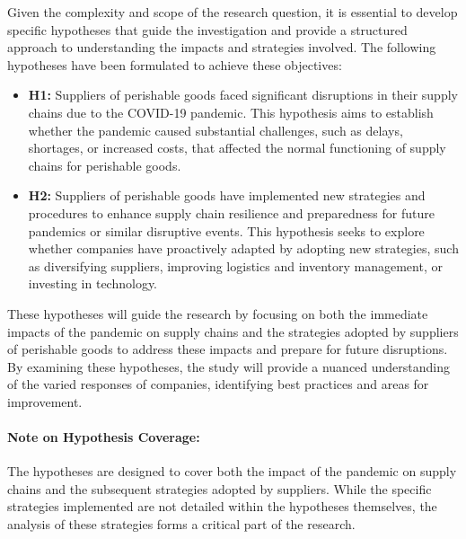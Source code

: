 Given the complexity and scope of the research question, it is essential to develop specific hypotheses that guide the investigation and provide a structured approach to understanding the impacts and strategies involved. The following hypotheses have been formulated to achieve these objectives:

\begin{itemize}
    \item \textbf{H1:} Suppliers of perishable goods faced significant disruptions in their supply chains due to the COVID-19 pandemic. This hypothesis aims to establish whether the pandemic caused substantial challenges, such as delays, shortages, or increased costs, that affected the normal functioning of supply chains for perishable goods.

    \item \textbf{H2:} Suppliers of perishable goods have implemented new strategies and procedures to enhance supply chain resilience and preparedness for future pandemics or similar disruptive events. This hypothesis seeks to explore whether companies have proactively adapted by adopting new strategies, such as diversifying suppliers, improving logistics and inventory management, or investing in technology.

\end{itemize}

These hypotheses will guide the research by focusing on both the immediate impacts of the pandemic on supply chains and the strategies adopted by suppliers of perishable goods to address these impacts and prepare for future disruptions. By examining these hypotheses, the study will provide a nuanced understanding of the varied responses of companies, identifying best practices and areas for improvement.

\paragraph*{\textbf{Note on Hypothesis Coverage:}} The hypotheses are designed to cover both the impact of the pandemic on supply chains and the subsequent strategies adopted by suppliers. While the specific strategies implemented are not detailed within the hypotheses themselves, the analysis of these strategies forms a critical part of the research.
